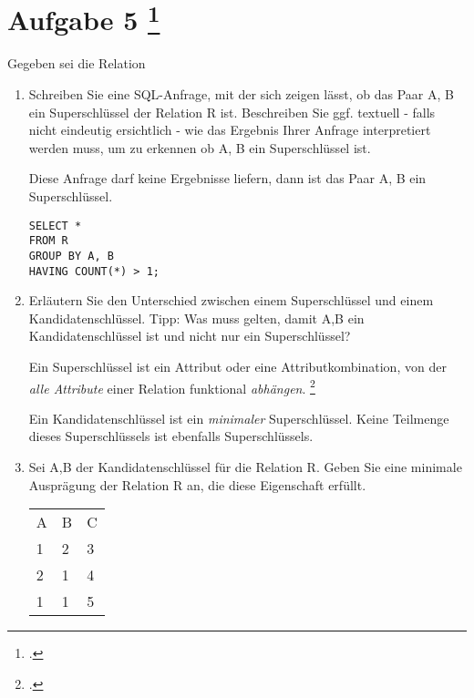 \documentclass{lehramt-informatik-aufgabe}
\begin{document}
\section{Aufgabe 5
\footcite{66116:2020:03}}

Gegeben sei die Relation 

\begin{enumerate}
\item Schreiben Sie eine SQL-Anfrage, mit der sich zeigen lässt, ob das
Paar A, B ein Superschlüssel der Relation R ist. Beschreiben Sie ggf.
textuell - falls nicht eindeutig ersichtlich - wie das Ergebnis Ihrer
Anfrage interpretiert werden muss, um zu erkennen ob A, B ein
Superschlüssel ist.

\begin{liAntwort}
Diese Anfrage darf keine Ergebnisse liefern, dann ist das Paar A, B ein
Superschlüssel.
\begin{verbatim}
SELECT *
FROM R
GROUP BY A, B
HAVING COUNT(*) > 1;
\end{verbatim}
\end{liAntwort}

\item Erläutern Sie den Unterschied zwischen einem Superschlüssel und
einem Kandidatenschlüssel. Tipp: Was muss gelten, damit A,B ein
Kandidatenschlüssel ist und nicht nur ein Superschlüssel?

\begin{liAntwort}
Ein Superschlüssel ist ein Attribut oder
eine Attributkombination, von der \emph{alle Attribute} einer Relation
funktional \emph{abhängen}.
\footcite[Seite 181 Kapitel 6.2 „Superschlüssel“]{kemper}

Ein Kandidatenschlüssel ist ein \emph{minimaler} Superschlüssel. Keine
Teilmenge dieses Superschlüssels ist ebenfalls Superschlüssels.

\end{liAntwort}

\item Sei A,B der Kandidatenschlüssel für die Relation R. Geben Sie eine
minimale Ausprägung der Relation R an, die diese Eigenschaft erfüllt.

\begin{liAntwort}
\begin{tabular}{lll}
A & B & C \\
1 & 2 & 3 \\
2 & 1 & 4 \\
1 & 1 & 5 \\
\end{tabular}
\end{liAntwort}

\end{enumerate}
\end{document}
